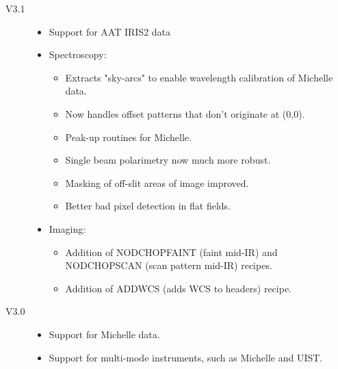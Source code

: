 \documentclass[twoside,11pt]{article}
\renewcommand{\_}{\texttt{\symbol{95}}}
\begin{document}
\begin{description}

\item[V3.1]

\begin{itemize}

\item Support for AAT IRIS2 data

\item Spectroscopy:

\begin{itemize}

\item Extracts "sky-arcs" to enable wavelength calibration of Michelle data.

\item Now handles offset patterns that don't originate at (0,0).

\item Peak-up routines for Michelle.

\item Single beam polarimetry now much more robust.

\item Masking of off-slit areas of image improved.

\item Better bad pixel detection in flat fields.

\end{itemize}

\item Imaging:

\begin{itemize}

\item Addition of NOD\_CHOP\_FAINT (faint mid-IR) and
    NOD\_CHOP\_SCAN (scan pattern mid-IR) recipes.

\item Addition of ADDWCS (adds WCS to headers) recipe.

\end{itemize}

\end{itemize}

\item[V3.0]

\begin{itemize}

\item Support for Michelle data.

\item Support for multi-mode instruments, such as Michelle and UIST.


\end{itemize}
\end{description}
\end{document}
